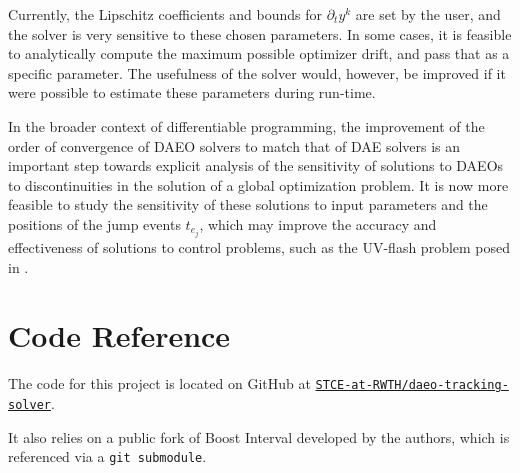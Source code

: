 \documentclass[twoside,leqno, twocolumn]{article}
\begin{document}
Currently, the Lipschitz coefficients and bounds for $\partial_ty^k$ are set by the user, and the solver is very sensitive to these chosen parameters. In some cases, it is feasible to analytically compute the maximum possible optimizer drift, and pass that as a specific parameter. The usefulness of the solver would, however, be improved if it were possible to estimate these parameters during run-time.


In the broader context of differentiable programming, the improvement of the order of convergence of DAEO solvers to match that of DAE solvers is an important step towards explicit analysis of the sensitivity of solutions to DAEOs to discontinuities in the solution of a global optimization problem. It is now more feasible to study the sensitivity of these solutions to input parameters and the positions of the jump events $t_{e_j}$, which may improve the accuracy and effectiveness of solutions to control problems, such as the UV-flash problem posed in \cite{ritschelAlgorithmGradientbasedDynamic2018}. 


\appendix
\section{Code Reference}
The code for this project is located on GitHub at
\href{https://github.com/STCE-at-RWTH/daeo-tracking-solver}{\texttt{STCE-at-RWTH/daeo-tracking-solver}}. 

It also relies on a public fork of Boost Interval developed by the authors, which is referenced via a \texttt{git submodule}.

\newpage

\printbibliography
\end{document}
